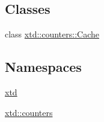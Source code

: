 \subsection*{Classes}
\begin{DoxyCompactItemize}
\item 
class \hyperlink{classxtd_1_1counters_1_1Cache}{xtd\+::counters\+::\+Cache}
\end{DoxyCompactItemize}
\subsection*{Namespaces}
\begin{DoxyCompactItemize}
\item 
 \hyperlink{namespacextd}{xtd}
\item 
 \hyperlink{namespacextd_1_1counters}{xtd\+::counters}
\end{DoxyCompactItemize}
